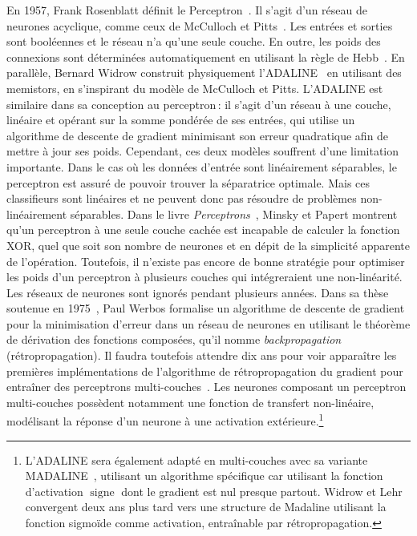 En 1957, Frank Rosenblatt définit le Perceptron~\cite{rosenblatt_perceptron_1957}. Il s'agit d'un réseau de neurones acyclique, comme ceux de McCulloch et Pitts~\cite{mcculloch_logical_1943}. Les entrées et sorties sont booléennes et le réseau n'a qu'une seule couche. En outre, les poids des connexions sont déterminées automatiquement en utilisant la règle de Hebb~\cite{hebb_organization_1949}. En parallèle, Bernard Widrow construit physiquement l'ADALINE~\cite{widrow_adaptive_1960} en utilisant des memistors, en s'inspirant du modèle de McCulloch et Pitts. L'ADALINE est similaire dans sa conception au perceptron\,: il s'agit d'un réseau à une couche, linéaire et opérant sur la somme pondérée de ses entrées, qui utilise un algorithme de descente de gradient minimisant son erreur quadratique afin de mettre à jour ses poids. Cependant, ces deux modèles souffrent d'une limitation importante. Dans le cas où les données d'entrée sont linéairement séparables, le perceptron est assuré de pouvoir trouver la séparatrice optimale. Mais ces classifieurs sont linéaires et ne peuvent donc pas résoudre de problèmes non-linéairement séparables. Dans le livre \emph{Perceptrons}~\cite{minsky_perceptrons_1969}, Minsky et Papert montrent qu'un perceptron à une seule couche cachée est incapable de calculer la fonction XOR, quel que soit son nombre de neurones et en dépit de la simplicité apparente de l'opération. Toutefois, il n'existe pas encore de bonne stratégie pour optimiser les poids d'un perceptron à plusieurs couches qui intégreraient une non-linéarité. Les réseaux de neurones sont ignorés pendant plusieurs années. Dans sa thèse soutenue en 1975~\cite{werbos_beyond_1975}, Paul Werbos formalise un algorithme de descente de gradient pour la minimisation d'erreur dans un réseau de neurones en utilisant le théorème de dérivation des fonctions composées, qu'il nomme \emph{backpropagation} (rétropropagation). Il faudra toutefois attendre dix ans pour voir apparaître les premières implémentations de l'algorithme de rétropropagation du gradient pour entraîner des perceptrons multi-couches~\cite{rumelhart_learning_1986,lecun_learning_1986}. Les neurones composant un perceptron multi-couches possèdent notamment une fonction de transfert non-linéaire, modélisant la réponse d'un neurone à une activation extérieure.\footnote{L'ADALINE sera également adapté en multi-couches avec sa variante MADALINE~\cite{winter_madaline_1988}, utilisant un algorithme spécifique car utilisant la fonction d'activation $\operatorname{signe}$ dont le gradient est nul presque partout. Widrow et Lehr convergent deux ans plus tard vers une structure de Madaline utilisant la fonction sigmoïde comme activation, entraînable par rétropropagation.}

